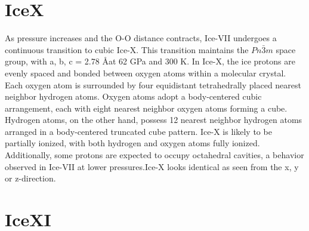 \section{IceX}
As pressure increases and the O-O distance contracts, Ice-VII undergoes a continuous transition to cubic Ice-X. This transition maintains the $Pn\bar{3}m$ space group, with a, b, c = 2.78 \AA at 62 GPa and 300 K\cite{Hemley_1987}. In Ice-X, the ice protons are evenly spaced and bonded between oxygen atoms within a molecular crystal\cite{Hirsch_1984}. Each oxygen atom is surrounded by four equidistant tetrahedrally placed nearest neighbor hydrogen atoms. Oxygen atoms adopt a body-centered cubic arrangement, each with eight nearest neighbor oxygen atoms forming a cube.\\
Hydrogen atoms, on the other hand, possess 12 nearest neighbor hydrogen atoms arranged in a body-centered truncated cube pattern. Ice-X is likely to be partially ionized, with both hydrogen and oxygen atoms fully ionized. Additionally, some protons are expected to occupy octahedral cavities, a behavior observed in Ice-VII at lower pressures.Ice-X looks identical as seen from the x, y or z-direction\cite{Guthrie_2013}.

\section{IceXI}

